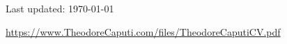 \documentclass[10pt, letterpaper]{article}
\begin{document}
%
%
%
%






\vfill{}

\begin{center}
{\scriptsize  Last updated: \today\


\href{https://www.TheodoreCaputi.com/files/TheodoreCaputiCV.pdf}{https://www.TheodoreCaputi.com/files/TheodoreCaputiCV.pdf}}
\end{center}
\end{document}
